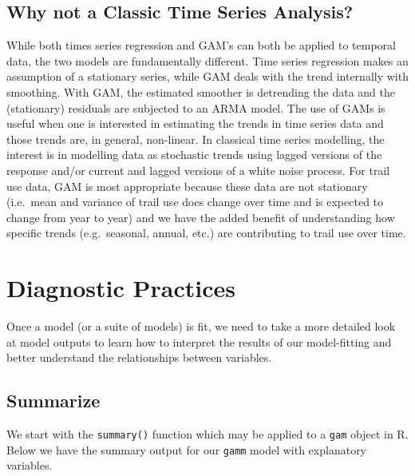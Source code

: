 \documentclass[
]{book}
\newenvironment{Shaded}{\begin{snugshade}}{\end{snugshade}}
\newcommand{\CommentTok}[1]{\textcolor[rgb]{0.56,0.35,0.01}{\textit{#1}}}
\newcommand{\FunctionTok}[1]{\textcolor[rgb]{0.00,0.00,0.00}{#1}}
\newcommand{\NormalTok}[1]{#1}
\newcommand{\SpecialCharTok}[1]{\textcolor[rgb]{0.00,0.00,0.00}{#1}}
\begin{document}
\hypertarget{why-not-a-classic-time-series-analysis}{%
\subsection{Why not a Classic Time Series Analysis?}\label{why-not-a-classic-time-series-analysis}}

While both times series regression and GAM's can both be applied to temporal data, the two models are fundamentally different. Time series regression makes an assumption of a stationary series, while GAM deals with the trend internally with smoothing. With GAM, the estimated smoother is detrending the data and the (stationary) residuals are subjected to an ARMA model. The use of GAMs is useful when one is interested in estimating the trends in time series data and those trends are, in general, non-linear. In classical time series modelling, the interest is in modelling data as stochastic trends using lagged versions of the response and/or current and lagged versions of a white noise process. For trail use data, GAM is most appropriate because these data are not stationary (i.e.~mean and variance of trail use does change over time and is expected to change from year to year) and we have the added benefit of understanding how specific trends (e.g.~seasonal, annual, etc.) are contributing to trail use over time.

\hypertarget{Diag}{%
\section{Diagnostic Practices}\label{Diag}}

Once a model (or a suite of models) is fit, we need to take a more detailed look at model outputs to learn how to interpret the results of our model-fitting and better understand the relationships between variables.

\hypertarget{summarize}{%
\subsection{Summarize}\label{summarize}}

We start with the \texttt{summary()} function which may be applied to a \texttt{gam} object in R. Below we have the summary output for our \texttt{gamm} model with explanatory variables.

\begin{Shaded}
\end{Shaded}
\end{document}
